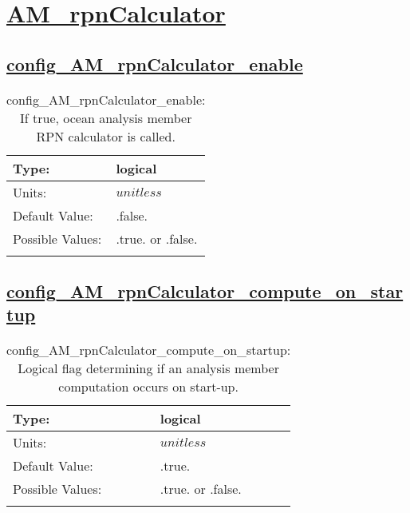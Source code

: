 \section[AM\_rpnCalculator]{\hyperref[sec:nm_tab_AM_rpnCalculator]{AM\_rpnCalculator}}
\label{sec:nm_sec_AM_rpnCalculator}
\subsection[config\_AM\_rpnCalculator\_enable]{\hyperref[sec:nm_tab_AM_rpnCalculator]{config\_AM\_rpnCalculator\_enable}}
\label{subsec:nm_sec_config_AM_rpnCalculator_enable}
\begin{center}
\begin{longtable}{| p{2.0in} || p{4.0in} |}
    \hline
    Type: & logical \\
    \hline
    Units: & $unitless$ \\
    \hline
    Default Value: & .false. \\
    \hline
    Possible Values: & .true. or .false. \\
    \hline
    \caption{config\_AM\_rpnCalculator\_enable: If true, ocean analysis member RPN calculator is called.}
\end{longtable}
\end{center}
\subsection[config\_AM\_rpnCalculator\_compute\_on\_startup]{\hyperref[sec:nm_tab_AM_rpnCalculator]{config\_AM\_rpnCalculator\_compute\_on\_startup}}
\label{subsec:nm_sec_config_AM_rpnCalculator_compute_on_startup}
\begin{center}
\begin{longtable}{| p{2.0in} || p{4.0in} |}
    \hline
    Type: & logical \\
    \hline
    Units: & $unitless$ \\
    \hline
    Default Value: & .true. \\
    \hline
    Possible Values: & .true. or .false. \\
    \hline
    \caption{config\_AM\_rpnCalculator\_compute\_on\_startup: Logical flag determining if an analysis member computation occurs on start-up.}
\end{longtable}
\end{center}
